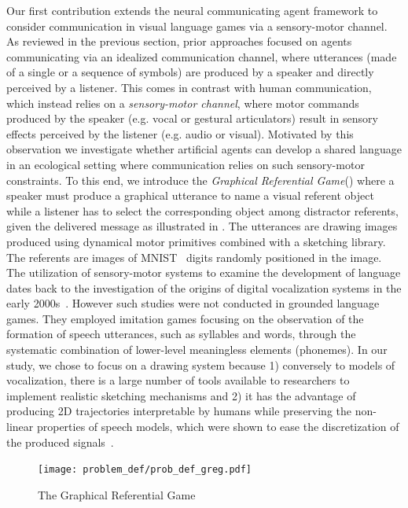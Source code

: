  Our first contribution   extends the neural communicating agent framework to consider communication in visual language games via a sensory-motor channel. As reviewed in the previous section, prior approaches focused on agents communicating via an idealized communication channel, where utterances (made of a single or a sequence of symbols) are produced by a speaker and directly perceived by a listener. This comes in contrast with human communication, which instead relies on a \emph{sensory-motor channel}, where motor commands produced by the speaker (e.g. vocal or gestural articulators) result in sensory effects perceived by the listener (e.g. audio or visual).  Motivated by this observation we investigate whether artificial agents can develop a shared language in an ecological setting where communication relies on such sensory-motor constraints. To this end, we introduce the \textit{Graphical Referential Game}(\greg) where a speaker must produce a graphical utterance to name a visual referent object while a listener has to select the corresponding object among distractor referents, given the delivered message as illustrated in . The utterances are drawing images produced using dynamical motor primitives combined with a sketching library. The referents are images of MNIST~\citep{LeCun1998GradientbasedLA} digits randomly positioned in the image.  The utilization of sensory-motor systems to examine the development of language dates back to the investigation of the origins of digital vocalization systems in the early 2000s~\cite{deBoer2000selforganization,oudeyer2005selforganization,zuidema2009evolution}. However such studies were not conducted in grounded language games. They employed imitation games focusing on the observation of the formation of speech utterances, such as syllables and words, through the systematic combination of lower-level meaningless elements (phonemes). In our study, we chose to focus on a drawing system because 1) conversely to models of vocalization, there is a large number of tools available to researchers to implement realistic sketching mechanisms and 2) it has the advantage of producing 2D trajectories interpretable by humans while preserving the non-linear properties of speech models, which were shown to ease the discretization of the produced signals~\cite{STEVENS19893,MOULINFRIER20155}.
 
\begin{figure}[!h]
\centering
\texttt{[image: problem\_def/prob\_def\_greg.pdf]}	
\caption{The Graphical Referential Game}
\label{fig:prob_def_greg}
\end{figure}

